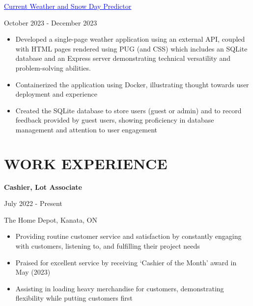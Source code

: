\documentclass[a4paper,11pt]{article}
\begin{document}
\begin{minipage}{.65\linewidth}
\href{https://github.com/JeremyFriesenGitHub/Weather-App-and-Snow-day-Project}{\textcolor{blue}{\uline{Current Weather and Snow Day Predictor}}}                
\end{minipage}
\hfill
\begin{minipage}{.34\linewidth}
    \flushright
    October 2023 - December 2023
\end{minipage}
\begin{minipage}{\linewidth}
\vspace{10pt}
\begin{itemize}
    \item Developed a single-page weather application using an external API, coupled with HTML pages rendered using PUG (and CSS) which includes an SQLite database and an Express server demonstrating technical versatility and problem-solving abilities.
    \item Containerized the application using Docker, illustrating thought towards user deployment and experience
    \item Created the SQLite database to store users (guest or admin) and to record feedback provided by guest users, showing proficiency in database management and attention to user engagement
  \end{itemize}
\end{minipage}


\vspace{2pt}
\section{WORK EXPERIENCE}
\begin{minipage}{.65\linewidth}
    \textbf{Cashier, Lot Associate} 
\end{minipage}
\begin{minipage}{.34\linewidth}
    \flushright
    July 2022 - Present
\end{minipage}
\begin{minipage}{.65\linewidth}
The Home Depot, Kanata, ON
\end{minipage}
\begin{minipage}{\linewidth}
\vspace{10pt}
\begin{itemize}
    \item Providing routine customer service and satisfaction by constantly engaging with customers, listening to, and fulfilling their project needs
    \item Praised for excellent service by receiving ‘Cashier of the Month’ award in May (2023)
    \item Assisting in loading heavy merchandise for customers, demonstrating flexibility while putting customers first
  \end{itemize}
  \end{minipage}
\end{document}
